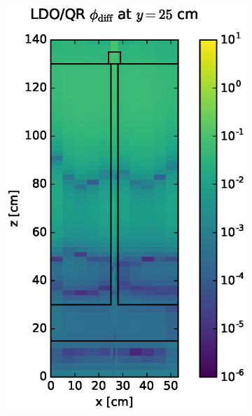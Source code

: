 \documentclass{article} %
\begin{document}
\begin{figure}[!htb]
\centering
\begin{subfigure}{0.4\textwidth}
\includegraphics[max height=0.445\textheight]
{img/steel-flux-diff-qr.eps}
\end{subfigure} ~
\begin{subfigure}{0.4\textwidth}

\end{subfigure}
\end{figure}
\end{document}
